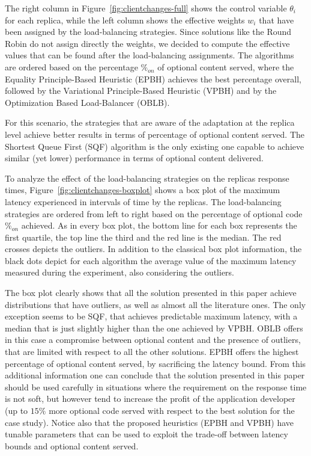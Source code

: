 The right column in Figure~\ref{fig:clientchanges-full} shows the
control variable $\theta_i$ for each replica, while the left
column shows the effective weights $w_i$ that have been assigned by
the load-balancing strategies. Since solutions like the Round Robin do not
assign directly the weights, we decided to compute the effective
values that can be found after the load-balancing assignments. The algorithms are
ordered based on the percentage $\%_{on}$ of optional content served,
where the Equality Principle-Based Heuristic (EPBH) achieves the best
percentage overall, followed by the Variational Principle-Based
Heuristic (VPBH) and by the Optimization Based Load-Balancer (OBLB).

For this scenario, the strategies that are aware of the adaptation at
the replica level achieve better results in terms of percentage of
optional content served. The Shortest Queue First (SQF) algorithm is
the only existing one capable to achieve similar (yet lower) performance in terms
of optional content delivered.

To analyze the effect of the load-balancing strategies on the replicas
response times, Figure~\ref{fig:clientchanges-boxplot} shows a box
plot of the maximum latency experienced in intervals of time by the
replicas. The load-balancing strategies are ordered from left to right based on
the percentage of optional code $\%_{on}$ achieved. As in every box
plot, the bottom line for each box represents the first quartile, the
top line the third and the red line is the median. The red crosses
depicts the outliers. In addition to the classical box plot
information, the black dots depict for each algorithm the average
value of the maximum latency measured during the experiment, also considering the outliers.

The box plot clearly shows that all the solution presented in this
paper achieve distributions that have outliers, as well as almost all
the literature ones. The only exception seems to be SQF, that achieves
predictable maximum latency, with a median that is just slightly
higher than the one achieved by VPBH. OBLB offers in this case a
compromise between optional content and the presence of outliers, that
are limited with respect to all the other solutions. EPBH offers the highest percentage of optional content served, by sacrificing the latency bound. From this additional
information one can conclude that the solution presented in this paper
should be used carefully in situations where the requirement on the
response time is not soft, but however tend to increase the profit of
the application developer (up to $15\%$ more optional code served with
respect to the best solution for the case study). Notice also that the proposed heuristics (EPBH and VPBH) have tunable parameters that can be used to exploit the trade-off between latency bounds and optional content served.

